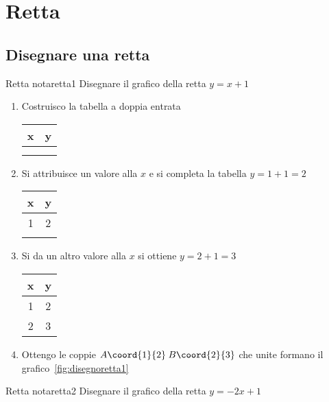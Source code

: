 \chapter{Retta}
\label{cha:retta}
\section{Disegnare una retta}
\begin{esempiot}{Retta nota}{retta1}
	Disegnare il grafico della retta $y=x+1$
\end{esempiot}
\begin{enumerate}
	\item Costruisco la tabella a doppia entrata 
		\begin{tabular}{c|c}
		x & y\\
		\hline 
		&  \\ 
		&  \\ 
	\end{tabular}
	\item Si attribuisce  un valore alla $x$ e si completa la tabella
	$y=1+1=2$
	\begin{tabular}{c|c}
		x & y\\
		\hline 
		1	& 2 \\ 
		&  \\ 
	\end{tabular}
	\item Si da un altro valore alla $x$ si ottiene 
	$y=2+1=3$
	\begin{tabular}{c|c}
		x & y\\
		\hline 
		1	& 2 \\ 
		2& 3 \\ 
	\end{tabular}
	\item Ottengo le coppie $A\coord{1}{2}$\,$B\coord{2}{3}$ che unite formano il grafico~\vref{fig:disegnoretta1}
\end{enumerate}
\begin{center}

\label{fig:disegnoretta1}
\end{center}
\begin{esempiot}{Retta nota}{retta2}
	Disegnare il grafico della retta $y=-2x+1$
\end{esempiot}
